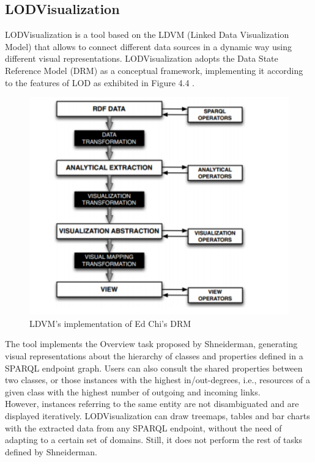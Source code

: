 \documentclass[a4paper,12pt,oneside]{report}
\begin{document}
{{{{\subsection{LODVisualization}
{LODVisualization is a tool based on the LDVM (Linked Data Visualization Model)  that allows to connect different data sources in a dynamic way using different visual representations. LODVisualization adopts the Data State Reference Model (DRM) as
a conceptual framework, implementing it according to the features of LOD as exhibited in Figure 4.4 .
\begin{figure}[h!]
\centering
\includegraphics[width=1\textwidth]{Capture12}
\caption{LDVM’s implementation of Ed Chi’s DRM}
\end{figure}
The tool implements the Overview task proposed by Shneiderman, generating visual representations about the hierarchy of classes and properties defined in a SPARQL endpoint graph. Users can also consult the shared properties between two classes, or those instances with the highest in/out-degrees, i.e., resources of a given class with the highest number of outgoing and incoming links.\\
However, instances referring to the same entity are not disambiguated and are displayed iteratively.
LODVisualization can draw treemaps, tables and bar charts with the extracted data from any SPARQL endpoint, without the need of adapting to a certain set of domains. Still, it does not perform the rest of tasks defined by Shneiderman.}
}}}}
\end{document}
